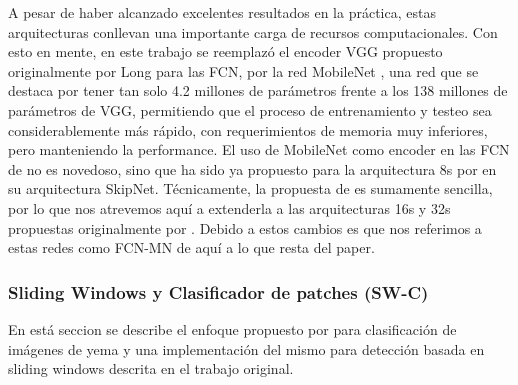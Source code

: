 \documentclass[a4paper,authoryear,review]{elsarticle}
\begin{document}
A pesar de haber alcanzado excelentes resultados en la práctica,  estas arquitecturas conllevan una importante carga de recursos computacionales. Con esto en mente, en este trabajo se reemplazó el encoder VGG \cite{Simonyan2015VeryDC} propuesto originalmente por Long para las FCN, por la red MobileNet \cite{howard2017mobilenets}, una red que se destaca por tener tan solo 4.2 millones de parámetros frente a los 138 millones de parámetros de VGG, permitiendo que el proceso de entrenamiento y testeo sea considerablemente más rápido,  con requerimientos de memoria muy inferiores, pero manteniendo la performance. El uso de MobileNet como encoder en las FCN de \citet{long2015fully} no es novedoso, sino que ha sido ya propuesto para la arquitectura 8s por \citet{siam2018rtseg} en su arquitectura SkipNet. Técnicamente, la propuesta de \citet{siam2018rtseg} es sumamente sencilla, por lo que nos atrevemos aquí a extenderla a las arquitecturas 16s y 32s propuestas originalmente por \citep{long2015fully}. Debido a estos cambios es que nos referimos a estas redes como FCN-MN de aquí a lo que resta del paper.




\subsubsection{Sliding Windows y Clasificador de patches (SW-C)}
\label{sec:sw}


En está seccion se describe el enfoque propuesto por \citet{perez2017image} para clasificación de imágenes de yema y una implementación del mismo para detección basada en sliding windows descrita en el trabajo original.
\end{document}
